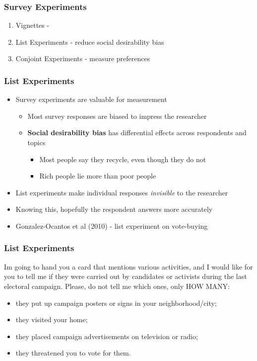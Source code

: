 \documentclass[xcolor=x11names,compress]{beamer}\usepackage[]{graphicx}\usepackage[]{color}
\renewcommand{\(}{\begin{columns}}
\renewcommand{\)}{\end{columns}}
\newcommand{\<}[1]{\begin{column}{#1}}
\renewcommand{\>}{\end{column}}
\begin{document}
\begin{frame}
\frametitle{Survey Experiments}
\begin{enumerate}
\item Vignettes - 
\item List Experiments - reduce social desirability bias
\item Conjoint Experiments - measure preferences
\end{enumerate}
\end{frame}

\begin{frame}
\frametitle{List Experiments}
\begin{itemize}
\item Survey experiments are valuable for measurement
\pause
\begin{itemize}
\item Most survey responses are biased to impress the researcher
\pause
\item \textbf{Social desirability bias} has differential effects across respondents and topics
\begin{itemize}
\item Most people say they recycle, even though they do not
\pause
\item Rich people lie more than poor people
\end{itemize}
\pause
\end{itemize}
\item List experiments make individual responses \textit{invisible} to the researcher
\pause
\item Knowing this, hopefully the respondent answers more accurately
\pause
\item Gonzalez-Ocantos et al (2010) - list experiment on vote-buying
\end{itemize}
\end{frame}

\begin{frame}
\frametitle{List Experiments}
Im going to hand you a card that mentions various activities, and
I would like for you to tell me if they were carried out by candidates
or activists during the last electoral campaign. Please, do not tell
me which ones, only HOW MANY:

\begin{itemize}
\item they put up campaign posters or signs in your neighborhood/city;
\item they visited your home;
\item they placed campaign advertisements on television or radio;
\item they threatened you to vote for them.
\end{itemize}
\end{frame}
\end{document}

